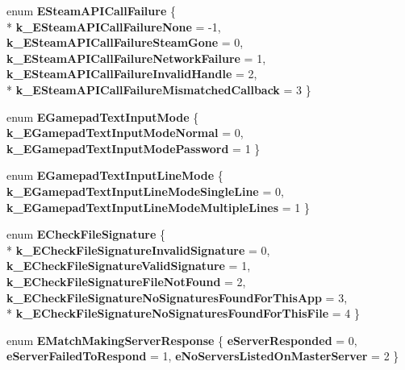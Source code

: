 \begin{DoxyCompactItemize}
\item 
\hypertarget{namespaceValve_1_1Steamworks_a0a1b9cce64b56560f7f83044b9c4f824}{}enum {\bfseries E\+Steam\+A\+P\+I\+Call\+Failure} \{ \\*
{\bfseries k\+\_\+\+E\+Steam\+A\+P\+I\+Call\+Failure\+None} = -\/1, 
{\bfseries k\+\_\+\+E\+Steam\+A\+P\+I\+Call\+Failure\+Steam\+Gone} = 0, 
{\bfseries k\+\_\+\+E\+Steam\+A\+P\+I\+Call\+Failure\+Network\+Failure} = 1, 
{\bfseries k\+\_\+\+E\+Steam\+A\+P\+I\+Call\+Failure\+Invalid\+Handle} = 2, 
\\*
{\bfseries k\+\_\+\+E\+Steam\+A\+P\+I\+Call\+Failure\+Mismatched\+Callback} = 3
 \}\label{namespaceValve_1_1Steamworks_a0a1b9cce64b56560f7f83044b9c4f824}

\item 
\hypertarget{namespaceValve_1_1Steamworks_a6e13d80af9284f0ae6147eb577039b7b}{}enum {\bfseries E\+Gamepad\+Text\+Input\+Mode} \{ {\bfseries k\+\_\+\+E\+Gamepad\+Text\+Input\+Mode\+Normal} = 0, 
{\bfseries k\+\_\+\+E\+Gamepad\+Text\+Input\+Mode\+Password} = 1
 \}\label{namespaceValve_1_1Steamworks_a6e13d80af9284f0ae6147eb577039b7b}

\item 
\hypertarget{namespaceValve_1_1Steamworks_a0d82182d4dc5da258194c76dc9e699fa}{}enum {\bfseries E\+Gamepad\+Text\+Input\+Line\+Mode} \{ {\bfseries k\+\_\+\+E\+Gamepad\+Text\+Input\+Line\+Mode\+Single\+Line} = 0, 
{\bfseries k\+\_\+\+E\+Gamepad\+Text\+Input\+Line\+Mode\+Multiple\+Lines} = 1
 \}\label{namespaceValve_1_1Steamworks_a0d82182d4dc5da258194c76dc9e699fa}

\item 
\hypertarget{namespaceValve_1_1Steamworks_a6e2bbb8d88f44a42f907d0ad18a84d77}{}enum {\bfseries E\+Check\+File\+Signature} \{ \\*
{\bfseries k\+\_\+\+E\+Check\+File\+Signature\+Invalid\+Signature} = 0, 
{\bfseries k\+\_\+\+E\+Check\+File\+Signature\+Valid\+Signature} = 1, 
{\bfseries k\+\_\+\+E\+Check\+File\+Signature\+File\+Not\+Found} = 2, 
{\bfseries k\+\_\+\+E\+Check\+File\+Signature\+No\+Signatures\+Found\+For\+This\+App} = 3, 
\\*
{\bfseries k\+\_\+\+E\+Check\+File\+Signature\+No\+Signatures\+Found\+For\+This\+File} = 4
 \}\label{namespaceValve_1_1Steamworks_a6e2bbb8d88f44a42f907d0ad18a84d77}

\item 
\hypertarget{namespaceValve_1_1Steamworks_a71daa6845484c22eb64ce353fc01cbd1}{}enum {\bfseries E\+Match\+Making\+Server\+Response} \{ {\bfseries e\+Server\+Responded} = 0, 
{\bfseries e\+Server\+Failed\+To\+Respond} = 1, 
{\bfseries e\+No\+Servers\+Listed\+On\+Master\+Server} = 2
 \}\label{namespaceValve_1_1Steamworks_a71daa6845484c22eb64ce353fc01cbd1}


\end{DoxyCompactItemize}
